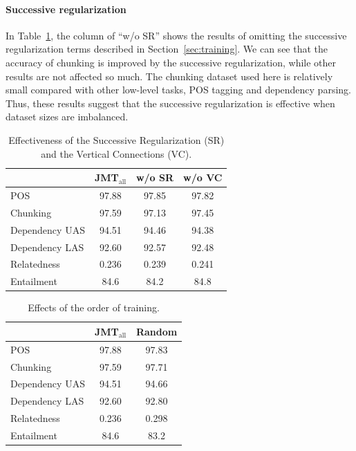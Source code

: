 \documentclass[11pt,a4paper]{article}
\begin{document}
\paragraph{Successive regularization}
In Table~\ref{tb:successive_reg}, the column of ``w/o SR'' shows the results of omitting the successive regularization terms described in Section~\ref{sec:training}.
We can see that the accuracy of chunking is improved by the successive regularization, while other results are not affected so much.
The chunking dataset used here is relatively small compared with other low-level tasks, POS tagging and dependency parsing.
Thus, these results suggest that the successive regularization is effective when dataset sizes are imbalanced.


\begin{table}[t]
{\scriptsize
	\begin{center}
	\begin{tabular}{l|c|c|c}
  			   & JMT$_{\mathrm{all}}$ & w/o SR & w/o VC \\ \hline
    POS        & 97.88 & 97.85		& 97.82 \\ \hline
    Chunking   & 97.59 & 97.13		& 97.45 \\ \hline
    Dependency UAS & 94.51 & 94.46 	& 94.38 \\
    Dependency LAS & 92.60 & 92.57 	& 92.48 \\ \hline
    Relatedness    & 0.236 & 0.239 	& 0.241 \\ \hline
    Entailment     & 84.6  & 84.2	& 84.8  \\ \hline
  \end{tabular}
  \end{center}
}
    \caption{Effectiveness of the Successive Regularization (SR) and the Vertical Connections (VC).}
    \label{tb:successive_reg}
\end{table}

\begin{table}[t]
{\scriptsize
	\begin{center}
	\begin{tabular}{l|c|c}
  			   & JMT$_{\mathrm{all}}$ & Random \\ \hline
    POS        & 97.88 & 97.83	\\ \hline
    Chunking   & 97.59 & 97.71	\\ \hline
    Dependency UAS & 94.51 & 94.66 \\
    Dependency LAS & 92.60 & 92.80 	\\ \hline
    Relatedness    & 0.236 & 0.298 	\\ \hline
    Entailment     & 84.6  & 83.2	\\ \hline
  \end{tabular}
  \end{center}
}
    \caption{Effects of the order of training.}
    \label{tb:random}
\end{table}
\end{document}
